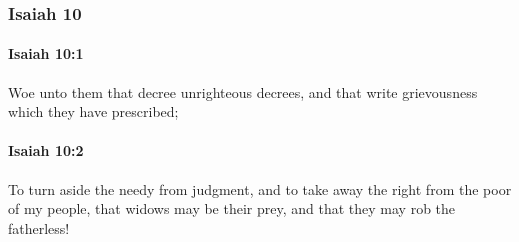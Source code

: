 	\subsubsection{Isaiah 10} %
		\label{ISAIAH-10}

		\paragraph{Isaiah 10:1} %
			\label{ISAIAH-10-1}

			Woe unto them that decree unrighteous decrees, and that write grievousness which they have prescribed;


		\paragraph{Isaiah 10:2} %
			\label{ISAIAH-10-2}

			To turn aside the needy from judgment, and to take away the right from the poor of my people, that widows may be their prey, and that they may rob the fatherless!

